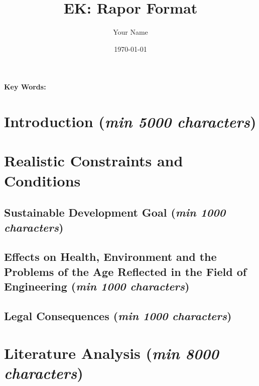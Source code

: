 \documentclass[12pt]{report}
\title{EK: Rapor Format}
\author{Your Name}
\date{\today}
\renewcommand{\thesection}{\arabic{section}}
\newcommand{\characters}[1]{(\textit{min #1 characters})}
\begin{document}
\maketitle

\begin{abstract}
\lipsum[1] %
\end{abstract}

\textbf{Key Words:} %

\tableofcontents
\renewcommand{\thechapter}{\arabic{chapter}}
\renewcommand{\thesection}{\arabic{section}}
\setcounter{secnumdepth}{0} %

\newpage

\section{Introduction \characters{5000}}
\lipsum[2-4] %

\section{Realistic Constraints and Conditions}

\subsection{Sustainable Development Goal \characters{1000}}
\lipsum[5] %

\subsection{Effects on Health, Environment and the Problems of the Age Reflected in the Field of Engineering \characters{1000}}
\lipsum[6] %

\subsection{Legal Consequences \characters{1000}}
\lipsum[7] %

\section{Literature Analysis \characters{8000}}
\lipsum[8] %
\end{document}
